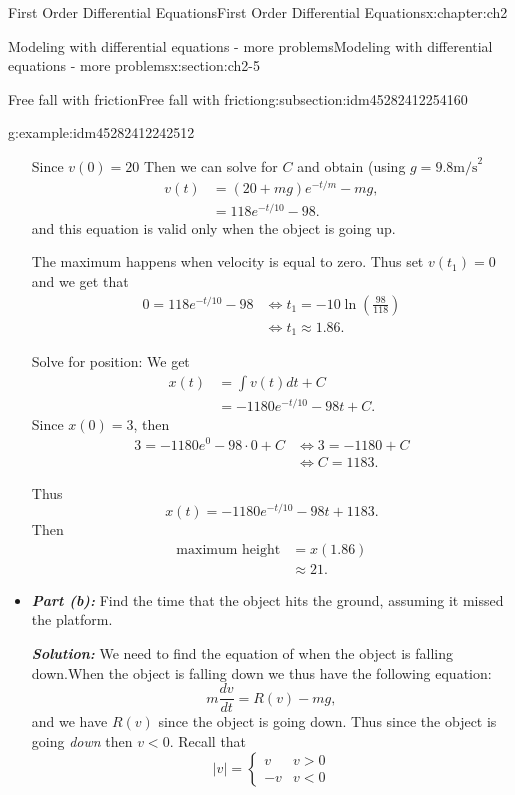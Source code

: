 \documentclass[oneside,10pt,]{book}
\newcommand{\alert}[1]{\textbf{\textit{#1}}}
\numberwithin{equation}{section}
\numberwithin{equation}{section}
\newcommand{\lt}{<}
\newcommand{\amp}{&}
\begin{document}
\begin{chapterptx}{First Order Differential Equations}{}{First Order Differential Equations}{}{}{x:chapter:ch2}
\begin{sectionptx}{Modeling with differential equations - more problems}{}{Modeling with differential equations - more problems}{}{}{x:section:ch2-5}
\begin{subsectionptx}{Free fall with friction}{}{Free fall with friction}{}{}{g:subsection:idm45282412254160}
\begin{example}{}{g:example:idm45282412242512}
\begin{itemize}[label=\textbullet]
\par
Since \(v(0)=20\) Then we can solve for \(C\) and obtain (using \(g=9.8 \text{m/s}^2\)%
\begin{align*}
v(t) \amp =\left(20+mg\right)e^{-t/m}-mg,\\
\amp =118e^{-t/10}-98.
\end{align*}
and this equation is valid only when the object is going up.%
\par
The maximum happens when velocity is equal to zero. Thus set \(v(t_{1})=0\) and we get that%
\begin{align*}
0=118e^{-t/10}-98 \amp \iff t_{1}=-10\ln\left(\frac{98}{118}\right)\\
\amp \iff t_{1}\approx1.86.
\end{align*}
%
\par
Solve for position: We get%
\begin{align*}
x(t) \amp =\int v(t)dt+C\\
\amp =-1180e^{-t/10}-98t+C.
\end{align*}
Since \(x(0)=3\), then%
\begin{align*}
3=-1180e^{0}-98\cdot0+C \amp \iff3=-1180+C\\
\amp \iff C=1183.
\end{align*}
%
\par
Thus%
\begin{equation*}
x(t)=-1180e^{-t/10}-98t+1183.
\end{equation*}
Then%
\begin{align*}
\text{maximum height} \amp =x(1.86)\\
\amp \approx21.
\end{align*}
%
\item{}\alert{Part (b):} Find the time that the object hits the ground, assuming it missed the platform.%
\par
\alert{Solution:} We need to find the equation of when the object is falling down.When the object is falling down we thus have the following equation:%
\begin{equation*}
m\frac{dv}{dt}=R(v)-mg,
\end{equation*}
and we have \(R(v)\) since the object is going down. Thus since the object is going \emph{down} then \(v\lt0\). Recall that%
\begin{equation*}
\left|v\right|=\begin{cases}
v \amp v>0\\
-v \amp v\lt0
\end{cases}
\end{equation*}

\end{itemize}
\end{example}
\end{subsectionptx}
\end{sectionptx}
\end{chapterptx}
\end{document}
